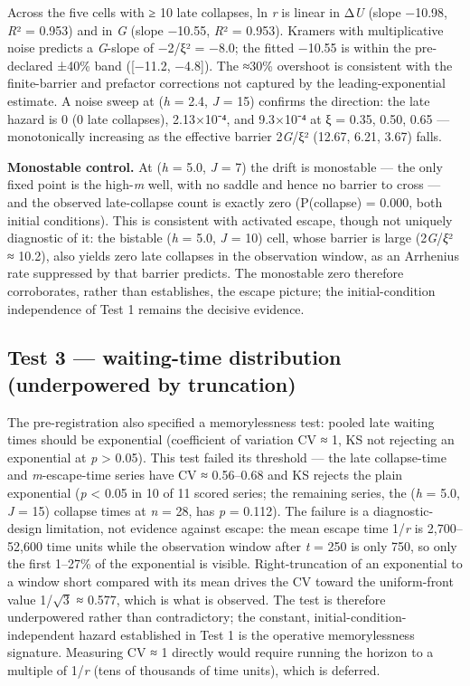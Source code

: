 \documentclass[11pt,letterpaper]{article}
\begin{document}
Across the five cells with ≥ 10 late collapses, ln \emph{r} is linear in Δ\emph{U} (slope −10.98, \emph{R}² = 0.953) and in \emph{G} (slope −10.55, \emph{R}² = 0.953). Kramers with multiplicative noise predicts a \emph{G}-slope of −2/ξ² = −8.0; the fitted −10.55 is within the pre-declared ±40\% band ({[}−11.2, −4.8{]}). The ≈30\% overshoot is consistent with the finite-barrier and prefactor corrections not captured by the leading-exponential estimate. A noise sweep at (\emph{h} = 2.4, \emph{J} = 15) confirms the direction: the late hazard is 0 (0 late collapses), 2.13×10⁻⁴, and 9.3×10⁻⁴ at ξ = 0.35, 0.50, 0.65 --- monotonically increasing as the effective barrier 2\emph{G}/ξ² (12.67, 6.21, 3.67) falls.

\textbf{Monostable control.} At (\emph{h} = 5.0, \emph{J} = 7) the drift is monostable --- the only fixed point is the high-\emph{m} well, with no saddle and hence no barrier to cross --- and the observed late-collapse count is exactly zero (P(collapse) = 0.000, both initial conditions). This is consistent with activated escape, though not uniquely diagnostic of it: the bistable (\emph{h} = 5.0, \emph{J} = 10) cell, whose barrier is large (2\emph{G}/\emph{ξ}² ≈ 10.2), also yields zero late collapses in the observation window, as an Arrhenius rate suppressed by that barrier predicts. The monostable zero therefore corroborates, rather than establishes, the escape picture; the initial-condition independence of Test 1 remains the decisive evidence.

\subsection{Test 3 --- waiting-time distribution (underpowered by truncation)}\label{test-3-waiting-time-distribution-underpowered-by-truncation}

The pre-registration also specified a memorylessness test: pooled late waiting times should be exponential (coefficient of variation CV ≈ 1, KS not rejecting an exponential at \emph{p} \textgreater{} 0.05). This test failed its threshold --- the late collapse-time and \emph{m}-escape-time series have CV ≈ 0.56--0.68 and KS rejects the plain exponential (\emph{p} \textless{} 0.05 in 10 of 11 scored series; the remaining series, the (\emph{h} = 5.0, \emph{J} = 15) collapse times at \emph{n} = 28, has \emph{p} = 0.112). The failure is a diagnostic-design limitation, not evidence against escape: the mean escape time 1/\emph{r} is 2,700--52,600 time units while the observation window after \emph{t} = 250 is only 750, so only the first 1--27\% of the exponential is visible. Right-truncation of an exponential to a window short compared with its mean drives the CV toward the uniform-front value 1/\(\sqrt{3}\) ≈ 0.577, which is what is observed. The test is therefore underpowered rather than contradictory; the constant, initial-condition-independent hazard established in Test 1 is the operative memorylessness signature. Measuring CV ≈ 1 directly would require running the horizon to a multiple of 1/\emph{r} (tens of thousands of time units), which is deferred.
\end{document}
